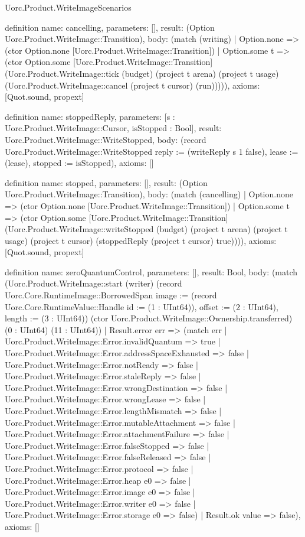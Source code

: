 \begin{lexlean}{Uorc.Product.WriteImageScenarios}
\begin{semanticmodule}
definition{
  name: cancelling,
  parameters: [],
  result: (Option Uorc.Product.WriteImage::Transition),
  body: (match (writing)
    | Option.none => (ctor Option.none [Uorc.Product.WriteImage::Transition])
    | Option.some t => (ctor Option.some [Uorc.Product.WriteImage::Transition] (Uorc.Product.WriteImage::tick (budget) (project t arena) (project t usage) (Uorc.Product.WriteImage::cancel (project t cursor) (run))))),
  axioms: [Quot.sound, propext]
}

definition{
  name: stoppedReply,
  parameters: [s : Uorc.Product.WriteImage::Cursor, isStopped : Bool],
  result: Uorc.Product.WriteImage::WriteStopped,
  body: (record Uorc.Product.WriteImage::WriteStopped {reply := (writeReply s 1 false), lease := (lease), stopped := isStopped}),
  axioms: []
}

definition{
  name: stopped,
  parameters: [],
  result: (Option Uorc.Product.WriteImage::Transition),
  body: (match (cancelling)
    | Option.none => (ctor Option.none [Uorc.Product.WriteImage::Transition])
    | Option.some t => (ctor Option.some [Uorc.Product.WriteImage::Transition] (Uorc.Product.WriteImage::writeStopped (budget) (project t arena) (project t usage) (project t cursor) (stoppedReply (project t cursor) true)))),
  axioms: [Quot.sound, propext]
}

definition{
  name: zeroQuantumControl,
  parameters: [],
  result: Bool,
  body: (match (Uorc.Product.WriteImage::start (writer) (record Uorc.Core.RuntimeImage::BorrowedSpan {image := (record Uorc.Core.RuntimeValue::Handle {id := (1 : UInt64)}), offset := (2 : UInt64), length := (3 : UInt64)}) (ctor Uorc.Product.WriteImage::Ownership.transferred) (0 : UInt64) (11 : UInt64))
    | Result.error err => (match err
      | Uorc.Product.WriteImage::Error.invalidQuantum => true
      | Uorc.Product.WriteImage::Error.addressSpaceExhausted => false
      | Uorc.Product.WriteImage::Error.notReady => false
      | Uorc.Product.WriteImage::Error.staleReply => false
      | Uorc.Product.WriteImage::Error.wrongDestination => false
      | Uorc.Product.WriteImage::Error.wrongLease => false
      | Uorc.Product.WriteImage::Error.lengthMismatch => false
      | Uorc.Product.WriteImage::Error.mutableAttachment => false
      | Uorc.Product.WriteImage::Error.attachmentFailure => false
      | Uorc.Product.WriteImage::Error.falseStopped => false
      | Uorc.Product.WriteImage::Error.falseReleased => false
      | Uorc.Product.WriteImage::Error.protocol => false
      | Uorc.Product.WriteImage::Error.heap e0 => false
      | Uorc.Product.WriteImage::Error.image e0 => false
      | Uorc.Product.WriteImage::Error.writer e0 => false
      | Uorc.Product.WriteImage::Error.storage e0 => false)
    | Result.ok value => false),
  axioms: []
}


\end{semanticmodule}
\end{lexlean}
